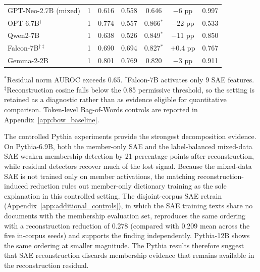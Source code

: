 \begin{table}[!t]
\begin{tabular}{@{}lcccccc@{}}
GPT-Neo-2.7B (mixed)           & 1 & 0.616 & 0.558 & 0.646 & $-$6 pp  & 0.997 \\
OPT-6.7B$^{\ddagger}$          & 1 & 0.774 & 0.557 & 0.866$^{*}$ & $-$22 pp & 0.533 \\
Qwen2-7B                       & 1 & 0.638 & 0.526 & 0.849$^{*}$ & $-$11 pp & 0.850 \\
Falcon-7B$^{\dagger\ddagger}$ & 1 & 0.690 & 0.694 & 0.827$^{*}$ & $+$0.4 pp & 0.767 \\
Gemma-2-2B                     & 1 & 0.801 & 0.769 & 0.820 & $-$3 pp  & 0.911 \\
\bottomrule
\end{tabular}

\vspace{0.5em}
\footnotesize{
$^{*}$Residual norm AUROC exceeds 0.65.
$^{\dagger}$Falcon-7B activates only 9 SAE features.
$^{\ddagger}$Reconstruction cosine falls below the 0.85 permissive threshold, so the setting is retained as a diagnostic rather than as evidence eligible for quantitative comparison.
Token-level Bag-of-Words controls are reported in Appendix~\ref{app:bow_baseline}.
}
\end{table}

The controlled Pythia experiments provide the strongest decomposition evidence. On Pythia-6.9B, both the member-only SAE and the label-balanced mixed-data SAE weaken membership detection by 21 percentage points after reconstruction, while residual detectors recover much of the lost signal. Because the mixed-data SAE is not trained only on member activations, the matching reconstruction-induced reduction rules out member-only dictionary training as the sole explanation in this controlled setting. The disjoint-corpus SAE retrain (Appendix~\ref{app:additional_controls}), in which the SAE training texts share no documents with the membership evaluation set, reproduces the same ordering with a reconstruction reduction of 0.278 (compared with 0.209 mean across the five in-corpus seeds) and supports the finding independently. Pythia-12B shows the same ordering at smaller magnitude. The Pythia results therefore suggest that SAE
reconstruction discards membership evidence that remains available in the reconstruction residual.

